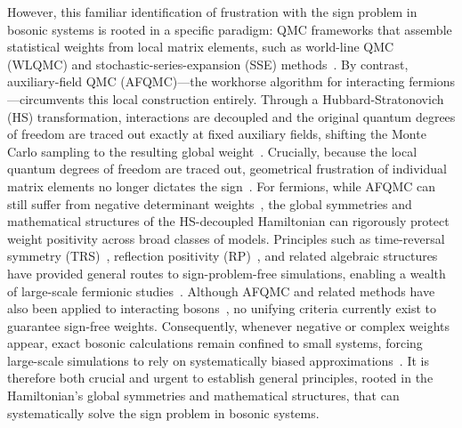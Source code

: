 \documentclass[twocolumn,aps,prl,amsmath,amssymb,superscriptaddress,longbibliography]{revtex4-2}
\begin{document}
However, this familiar identification of frustration with the sign problem in bosonic systems is rooted in a specific paradigm: QMC frameworks that assemble statistical weights from local matrix elements, such as world-line QMC (WLQMC) and stochastic-series-expansion (SSE) methods~\cite{suzuki1976,sandvik1999prb,prokofev1998pla,evertz2003advphys,syljuasenSandvik2002,satoAssaadGrover2018,ringelKovrizhin2017,Rayudu2025arxiv}. By contrast, auxiliary-field QMC (AFQMC)---the workhorse algorithm for interacting fermions---circumvents this local construction entirely. Through a Hubbard-Stratonovich (HS) transformation, interactions are decoupled and the original quantum degrees of freedom are traced out exactly at fixed auxiliary fields, shifting the Monte Carlo sampling to the resulting global weight~\cite{stratonovich1957,hubbard1959,scalapino1981prl,blankenbecler1981prd,hirsch1981prl,assaadEvertz2008,Assaad2025scipostcodebases,CohenStead2026scipostcodebases}. Crucially, because the local quantum degrees of freedom are traced out, geometrical frustration of individual matrix elements no longer dictates the sign~\cite{satoAssaadGrover2018}. For fermions, while AFQMC can still suffer from negative determinant weights~\cite{loh1990prb}, the global symmetries and mathematical structures of the HS-decoupled Hamiltonian can rigorously protect weight positivity across broad classes of models. Principles such as time-reversal symmetry (TRS)~\cite{lang1993prc,wu2005prb,li2015prb,li2016prl}, reflection positivity (RP)~\cite{wei2016prl}, and related algebraic structures~\cite{wang2015prl,wei2024prb,li2019arcmp} have provided general routes to sign-problem-free simulations, enabling a wealth of large-scale fermionic studies~\cite{berg2012science,Wang2014prl,schattner2016prx,li2017prb,schattner2016prl,liJiangJianYao2017natcomm,jiang2017prb,gazit2017natphys,assaadGrover2016prx,gerlach2017prb,liJiangYao2017prl,lederer2017pnas,YU2024PRL,liVaeziMendlYao2018sciadv,liu2019natcomm,He2019PRL,Xu2023prr,Grover2021PRL,hofmann2022prx,liu2022prl,hofmann2023prl,lunts2023natcomm,Yu2024PRL2,cai2025pnas,patel2025prx,He2025PRL,wang2026arxivsuperradiantstronglycorrelatedquantum,Xu2026arXiv,shi2026arxivhightemperaturecharge4esuperconductivitysu4,He2026arXiv}. Although AFQMC and related methods have also been applied to interacting bosons~\cite{sugiyamaKoonin1986,ulmkeScalettar2000,purwanto2005pra,purwanto2004pre,Rubenstein2012PRA}, no unifying criteria currently exist to guarantee sign-free weights. Consequently, whenever negative or complex weights appear, exact bosonic calculations remain confined to small systems, forcing large-scale simulations to rely on systematically biased approximations~\cite{purwanto2004pre,Rubenstein2012PRA,malpettiRoscilde2017,Cai2025CPB}. It is therefore both crucial and urgent to establish general principles, rooted in the Hamiltonian's global symmetries and mathematical structures, that can systematically solve the sign problem in bosonic systems.
\end{document}
